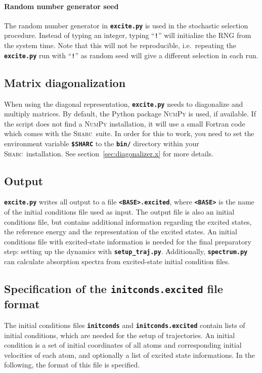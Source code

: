 \documentclass[a4paper,10pt,DIV=15,openany]{scrbook}
\newcommand{\sharc}{\textsc{Sharc}}
\newcommand{\ttt}[1]{\textbf{\texttt{#1}}}
\begin{document}
\paragraph{Random number generator seed}

The random number generator in \ttt{excite.py} is used in the stochastic selection procedure. Instead of typing an integer, typing ``\ttt{!}'' will initialize the RNG from the system time. Note that this will not be reproducible, i.e.\ repeating the \ttt{excite.py} run with ``\ttt{!}'' as random seed will give a different selection in each run.



\subsection{Matrix diagonalization}

When using the diagonal representation, \ttt{excite.py} needs to diagonalize and multiply matrices. By default, the Python package \textsc{NumPy} is used, if available. If the script does not find a \textsc{NumPy} installation, it will use a small Fortran code which comes with the \sharc\ suite. In order for this to work, you need to set the environment variable \ttt{\$SHARC} to the \ttt{bin/} directory within your \sharc\ installation. See section~\ref{sec:diagonalizer.x} for more details.

\subsection{Output}

\ttt{excite.py} writes all output to a file \ttt{<BASE>.excited}, where \ttt{<BASE>} is the name of the initial conditions file used as input. The output file is also an initial conditions file, but contains additional information regarding the excited states, the reference energy and the representation of the excited states. An initial conditions file with excited-state information is needed for the final preparatory step: setting up the dynamics with \ttt{setup\_traj.py}.
Additionally, \ttt{spectrum.py} can calculate absorption spectra from excited-state initial condition files.

\subsection{Specification of the \ttt{initconds.excited} file format}\label{sec:initcondsfile}

The initial conditions files \ttt{initconds} and \ttt{initconds.excited} contain lists of initial conditions, which are needed for the setup of trajectories. An initial condition is a set of initial coordinates of all atoms and corresponding initial velocities of each atom, and optionally a list of excited state informations. In the following, the format of this file is specified.
\end{document}
